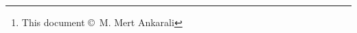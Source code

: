 \author{M. Mert Ankarali\thanks{This document \copyright~M. Mert Ankarali }\\
Department of Electrical and Electronics Engineering \\
Middle East Technical University\\
}

